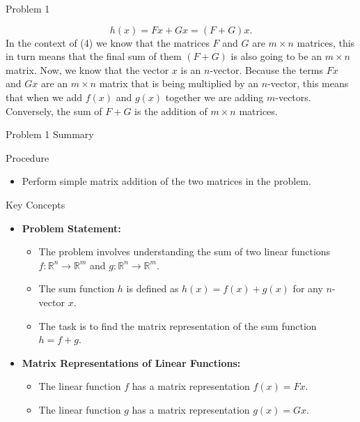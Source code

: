 \begin{problem}{Problem 1}
\begin{Highlight}[Solution]
        \begin{equation}
            h(x) = Fx + Gx = (F + G)x.
        \end{equation}
        In the context of (4) we know that the matrices $F$ and $G$ are $m \times n$ matrices, this in turn means that the final sum of them $(F + G)$ is also going to be an $m \times n$ matrix. Now,
        we know that the vector $x$ is an $n$-vector. Because the terms $Fx$ and $Gx$ are an $m \times n$ matrix that is being multiplied by an $n$-vector, this means that when we add $f(x)$ and $g(x)$
        together we are adding $m$-vectors. Conversely, the sum of $F + G$ is the addition of $m \times n$ matrices.
    \end{Highlight}
\end{problem}

\begin{summary}{Problem 1 Summary}
    \begin{statement}{Procedure}
        \begin{itemize}
            \item Perform simple matrix addition of the two matrices in the problem.
        \end{itemize}
    \end{statement}
    \begin{statement}{Key Concepts}
        \begin{itemize}
            \item \textbf{Problem Statement:}
            \begin{itemize}
                \item The problem involves understanding the sum of two linear functions $f: \mathbb{R}^n \to \mathbb{R}^m$ and $g: \mathbb{R}^n \to \mathbb{R}^m$.
                \item The sum function $h$ is defined as $h(x) = f(x) + g(x)$ for any $n$-vector $x$.
                \item The task is to find the matrix representation of the sum function $h = f + g$.
            \end{itemize}
            \item \textbf{Matrix Representations of Linear Functions:}
            \begin{itemize}
                \item The linear function $f$ has a matrix representation $f(x) = Fx$.
                \item The linear function $g$ has a matrix representation $g(x) = Gx$.

\end{itemize}
\end{itemize}
\end{statement}
\end{summary}
